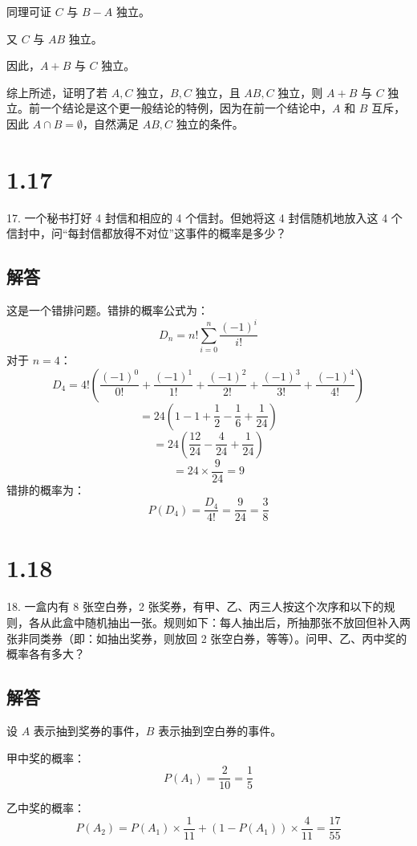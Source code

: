 \documentclass[UTF8]{report}
\theoremstyle{MyLineTheoremStyle} %
\theoremstyle{MyBlockTheoremStyle} %
\theoremstyle{MySubsubsectionStyle} %
\begin{document}
同理可证 \(C\) 与 \(B - A\) 独立。

又 \(C\) 与 \(AB\) 独立。

因此，\(A + B\) 与 \(C\) 独立。

综上所述，证明了若 \(A, C\) 独立，\(B, C\) 独立，且 \(AB, C\) 独立，则 \(A + B\) 与 \(C\) 独立。前一个结论是这个更一般结论的特例，因为在前一个结论中，\(A\) 和 \(B\) 互斥，因此 \(A \cap B = \emptyset\)，自然满足 \(AB, C\) 独立的条件。

\section{1.17}

17. 一个秘书打好 4 封信和相应的 4 个信封。但她将这 4 封信随机地放入这 4 个信封中，问“每封信都放得不对位”这事件的概率是多少？

\subsection*{解答}

这是一个错排问题。错排的概率公式为：
\[
D_n = n! \sum_{i=0}^{n} \frac{(-1)^i}{i!}
\]
对于 \(n = 4\)：
\[
D_4 = 4! \left( \frac{(-1)^0}{0!} + \frac{(-1)^1}{1!} + \frac{(-1)^2}{2!} + \frac{(-1)^3}{3!} + \frac{(-1)^4}{4!} \right)
\]
\[
= 24 \left( 1 - 1 + \frac{1}{2} - \frac{1}{6} + \frac{1}{24} \right)
\]
\[
= 24 \left( \frac{12}{24} - \frac{4}{24} + \frac{1}{24} \right)
\]
\[
= 24 \times \frac{9}{24} = 9
\]
错排的概率为：
\[
P(D_4) = \frac{D_4}{4!} = \frac{9}{24} = \frac{3}{8}
\]

\section{1.18}

18. 一盒内有 8 张空白券，2 张奖券，有甲、乙、丙三人按这个次序和以下的规则，各从此盒中随机抽出一张。规则如下：每人抽出后，所抽那张不放回但补入两张非同类券（即：如抽出奖券，则放回 2 张空白券，等等）。问甲、乙、丙中奖的概率各有多大？

\subsection*{解答}

设 \(A\) 表示抽到奖券的事件，\(B\) 表示抽到空白券的事件。

甲中奖的概率：
\[
P(A_1) = \frac{2}{10} = \frac{1}{5}
\]

乙中奖的概率：
\[
P(A_2) = P(A_1) \times \frac{1}{11} + (1-P(A_1)) \times \frac{4}{11} = \frac{17}{55}
\]
\end{document}
